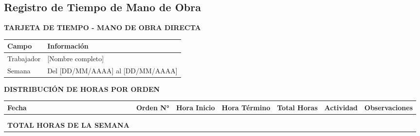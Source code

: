 \documentclass[
  stu,
  floatsintext,
  longtable,
  a4paper,
  nolmodern,
  notxfonts,
  notimes,
  12pt,
  colorlinks=true,linkcolor=blue,citecolor=blue,urlcolor=blue]{apa7}
\newcounter{none} %
\begin{document}
\section{}\label{}

\subsection{Registro de Tiempo de Mano de Obra}\label{apx-tiempo}

\textbf{TARJETA DE TIEMPO - MANO DE OBRA DIRECTA}

{\def\LTcaptype{none} %
\begin{longtable}[]{@{}ll@{}}
\toprule\noalign{}
Campo & Información \\
\midrule\noalign{}
\endhead
\bottomrule\noalign{}
\endlastfoot
Trabajador & {[}Nombre completo{]} \\
Semana & Del {[}DD/MM/AAAA{]} al {[}DD/MM/AAAA{]} \\
\end{longtable}
}

\textbf{DISTRIBUCIÓN DE HORAS POR ORDEN}

{\def\LTcaptype{none} %
\begin{longtable}[]{@{}
  >{\raggedright\arraybackslash}p{}
  >{\raggedright\arraybackslash}p{}
  >{\centering\arraybackslash}p{}
  >{\centering\arraybackslash}p{}
  >{\centering\arraybackslash}p{}
  >{\raggedright\arraybackslash}p{}
  >{\raggedright\arraybackslash}p{}@{}}
\toprule\noalign{}
\begin{minipage}[b]{\linewidth}\raggedright
Fecha
\end{minipage} & \begin{minipage}[b]{\linewidth}\raggedright
Orden N°
\end{minipage} & \begin{minipage}[b]{\linewidth}\centering
Hora Inicio
\end{minipage} & \begin{minipage}[b]{\linewidth}\centering
Hora Término
\end{minipage} & \begin{minipage}[b]{\linewidth}\centering
Total Horas
\end{minipage} & \begin{minipage}[b]{\linewidth}\raggedright
Actividad
\end{minipage} & \begin{minipage}[b]{\linewidth}\raggedright
Observaciones
\end{minipage} \\
\midrule\noalign{}
\endhead
\bottomrule\noalign{}
\endlastfoot
& & & & & & \\
& & & & & & \\
\textbf{TOTAL HORAS DE LA SEMANA} & & & & & & \\
\end{longtable}
}
\end{document}
